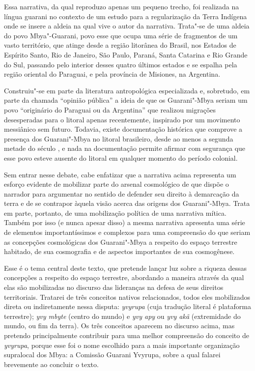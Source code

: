 \bigskip
\bigskip
Essa narrativa, da qual reproduzo apenas um pequeno trecho, foi
realizada na língua guarani no contexto de um estudo para a
regularização da Terra Indígena onde se insere a aldeia na qual vive o
autor da narrativa. Trata"-se de uma aldeia do povo Mbya"-Guarani, povo
esse que ocupa uma série de fragmentos de um vasto território, que
atinge desde a região litorânea do Brasil, nos Estados de Espírito
Santo, Rio de Janeiro, São Paulo, Paraná, Santa Catarina e Rio Grande
do Sul, passando pelo interior desses quatro últimos estados e se
espalha pela região oriental do Paraguai, e pela província de
Misiones, na Argentina.

Construiu"-se em parte da literatura antropológica especializada e,
sobretudo, em parte da chamada ``opinião pública'' a ideia de que os
Guarani"-Mbya seriam um povo ``originário do Paraguai ou da Argentina''
que realizou migrações desesperadas para o litoral apenas recentemente,
inspirado por um movimento messiânico sem futuro. Todavia, existe
documentação histórica que comprove a presença dos Guarani"-Mbya no
litoral brasileiro, desde ao menos a segunda metade do século , e
nada na documentação permite afirmar com segurança que esse povo esteve
ausente do litoral em qualquer momento do período colonial.

Sem entrar nesse debate, cabe enfatizar que a narrativa acima representa
um esforço evidente de mobilizar parte do arsenal cosmológico de que
dispõe o narrador para argumentar no sentido de defender seu direito à
demarcação da terra e de se contrapor àquela visão acerca das origens
dos Guarani"-Mbya. Trata em parte, portanto, de uma mobilização política
de uma narrativa mítica. Também por isso (e nunca apesar disso) a mesma
narrativa apresenta uma série de elementos importantíssimos e complexos
para uma compreensão do que seriam as concepções cosmológicas dos
Guarani"-Mbya a respeito do espaço terrestre habitado, de sua
cosmografia e de aspectos importantes de sua cosmogênese.

Esse é o tema central deste texto, que pretende lançar luz sobre a
riqueza dessas concepções a respeito do espaço terrestre, abordando a
maneira através da qual elas são mobilizadas no discurso das lideranças
na defesa de seus direitos territoriais. Tratarei de três conceitos
nativos relacionados, todos eles mobilizados direta ou indiretamente
nessa disputa: \emph{yvyrupa} (cuja tradução literal é plataforma terrestre);
\emph{yvy mbyte} (centro do mundo) e \emph{yvy apy} ou \emph{yvy akã} (extremidade do mundo,
ou fim da terra). Os três conceitos aparecem no discurso acima, mas
pretendo principalmente contribuir para uma melhor compreensão do
conceito de \emph{yvyrupa}, porque esse foi o nome escolhido para a mais
importante organização supralocal dos Mbya: a Comissão Guarani Yvyrupa,
sobre a qual falarei brevemente ao concluir o texto.

